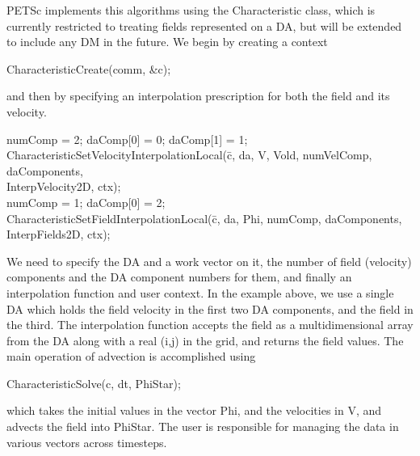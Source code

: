 \documentclass[twoside,12pt]{../sty/report_petsc}
\begin{document}
    PETSc implements this algorithms using the Characteristic class, which is currently restricted to treating fields
represented on a DA, but will be extended to include any DM in the future. We begin by creating a context
\begin{tabbing}
  CharacteristicCreate(comm, \&c);
\end{tabbing}
and then by specifying an interpolation prescription for both the field and its velocity.
\begin{tabbing}
  numComp = 2; daComp[0] = 0; daComp[1] = 1; \\
  CharacteristicSetVelocityInterpolationLocal(\=c, da, V, Vold, numVelComp, daComponents,\\
                                              \>InterpVelocity2D, ctx); \\
  numComp = 1; daComp[0] = 2; \\
  CharacteristicSetFieldInterpolationLocal(\=c, da, Phi, numComp, daComponents,\\
                                           \>InterpFields2D, ctx);
\end{tabbing}
We need to specify the DA and a work vector on it, the number of field (velocity) components and the DA component
numbers for them, and finally an interpolation function and user context. In the example above, we use a single DA which
holds the field velocity in the first two DA components, and the field in the third. The interpolation function accepts
the field as a multidimensional array from the DA along with a real (i,j) in the grid, and returns the field values. The
main operation of advection is accomplished using
\begin{tabbing}
  CharacteristicSolve(c, dt, PhiStar);
\end{tabbing}
which takes the initial values in the vector Phi, and the velocities in V, and advects the field into PhiStar. The user
is responsible for managing the data in various vectors across timesteps.
\end{document}
